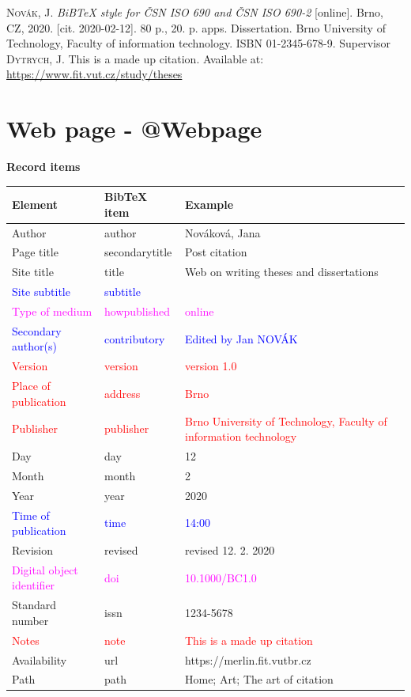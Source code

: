 \medskip

\noindent \textsc{Novák}, J. \textit{BiBTeX style for ČSN ISO 690 and ČSN ISO 690-2} [online]. Brno, CZ, 2020. [cit. 2020-02-12]. 80 p., 20. p. apps. Dissertation. Brno University of Technology, Faculty of information technology. ISBN 01-2345-678-9. Supervisor \textsc{Dytrych}, J. This is a made up citation. Available at: \url{https://www.fit.vut.cz/study/theses}
\newpage
\section*{Web page - @Webpage}
\label{pr-webpage}
\noindent \textbf{Record items}

\medskip

\begin{tabularx}{\linewidth}{X X X}
    Element & BibTeX item & Example\\\hline
    Author & author & Nováková, Jana\\
    Page title & secondarytitle & Post citation\\
    Site title & title & Web on writing theses and dissertations\\
    \textcolor{blue}{Site subtitle}  &  \textcolor{blue}{subtitle} & \\
    \textcolor{magenta}{Type of medium} & \textcolor{magenta}{howpublished} & \textcolor{magenta}{online}\\
    \textcolor{blue}{Secondary author(s)} & \textcolor{blue}{contributory} & \textcolor{blue}{Edited by Jan NOVÁK}\\
    \textcolor{red}{Version} & \textcolor{red}{version} & \textcolor{red}{version 1.0}\\
    \textcolor{red}{Place of publication} & \textcolor{red}{address} & \textcolor{red}{Brno}\\
    \textcolor{red}{Publisher} & \textcolor{red}{publisher} & \textcolor{red}{Brno University of Technology, Faculty of information technology}\\
    Day & day & 12\\
    Month & month & 2\\
    Year & year & 2020\\
    \textcolor{blue}{Time of publication} & \textcolor{blue}{time} & \textcolor{blue}{14:00}\\
    Revision & revised & revised 12. 2. 2020\\
    \textcolor{magenta}{Digital object identifier} & \textcolor{magenta}{doi} & \textcolor{magenta}{10.1000/BC1.0}\\
    Standard number & issn & 1234-5678\\
    \textcolor{red}{Notes} & \textcolor{red}{note} & \textcolor{red}{This is a made up citation}\\
    Availability & url & https://merlin.fit.vutbr.cz\\
    Path & path & Home; Art; The art of citation
\end{tabularx}

